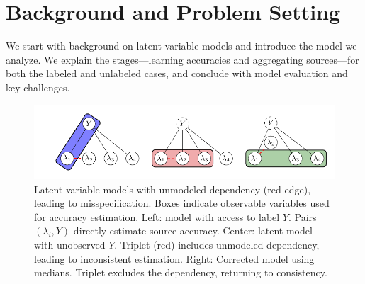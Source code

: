 \section{Background and Problem Setting} \label{sec:background}

We start with background on latent variable models and introduce the model we analyze. We explain the stages---learning accuracies and aggregating sources---for both the labeled and unlabeled cases, and conclude with model evaluation and key challenges.

\begin{figure}
    \centering
    \includegraphics[width=.7\textwidth]{figures/models.pdf}
    \caption{Latent variable models with unmodeled dependency (red edge), leading to misspecification. Boxes indicate observable variables used for accuracy estimation. Left: model with access to label $Y$. Pairs $(\lambda_i, Y)$ directly estimate source accuracy. Center: latent model with unobserved $Y$. Triplet (red) includes unmodeled dependency, leading to inconsistent estimation. Right: Corrected model using medians. Triplet excludes the dependency, returning to consistency.}
    \label{fig:biases}
\end{figure}




